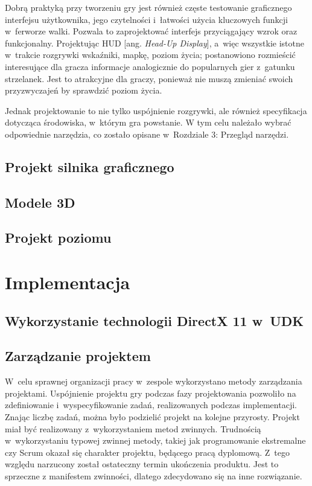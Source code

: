 Dobrą praktyką przy tworzeniu gry jest również częste testowanie graficznego interfejsu użytkownika, jego czytelności i~łatwości użycia kluczowych funkcji w~ferworze walki. Pozwala to zaprojektować interfejs przyciągający wzrok oraz funkcjonalny. Projektując HUD [ang. \emph{Head-Up Display}], a~więc wszystkie istotne w~trakcie rozgrywki wskaźniki, mapkę, poziom życia; postanowiono rozmieścić interesujące dla gracza informacje analogicznie do popularnych gier z~gatunku strzelanek. Jest to atrakcyjne dla graczy, ponieważ nie muszą zmieniać swoich przyzwyczajeń by sprawdzić poziom życia. 

Jednak projektowanie to nie tylko uspójnienie rozgrywki, ale również specyfikacja dotycząca środowiska, w~którym gra powstanie. W tym celu należało wybrać odpowiednie narzędzia, co zostało opisane w~Rozdziale 3: Przegląd narzędzi. 

\subsection{Projekt silnika graficznego}

\subsection{Modele 3D}

\subsection{Projekt poziomu}

\section{Implementacja}

\subsection{Wykorzystanie technologii DirectX 11 w~UDK}

\subsection{Zarządzanie projektem}
W~celu sprawnej organizacji pracy w~zespole wykorzystano metody zarządzania projektami. Uspójnienie projektu gry podczas fazy projektowania pozwoliło na zdefiniowanie i~wyspecyfikowanie zadań, realizowanych podczas implementacji. Znając liczbę zadań, można było podzielić projekt na kolejne przyrosty. Projekt miał być realizowany z~wykorzystaniem metod zwinnych. Trudnością w~wykorzystaniu typowej zwinnej metody, takiej jak programowanie ekstremalne czy Scrum okazał się charakter projektu, będącego pracą dyplomową. Z~tego względu narzucony został ostateczny termin ukończenia produktu. Jest to sprzeczne z manifestem zwinności, dlatego zdecydowano się na inne rozwiązanie.

